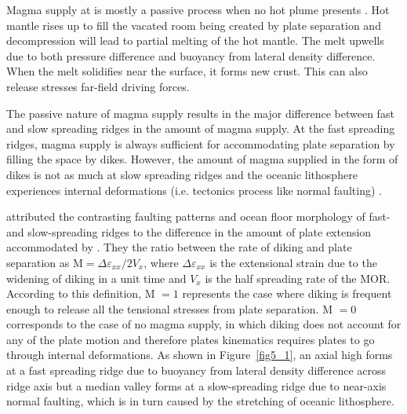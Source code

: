 \documentclass[12pt]{article}
\begin{document}
Magma supply at  is mostly a passive process when no hot plume presents \citep{Fowler2004}. Hot mantle rises up to fill the vacated room being created by plate separation and decompression will lead to partial melting of the hot mantle. The melt upwells due to both pressure difference and buoyancy from lateral density difference. When the melt solidifies near the surface, it forms new crust. This  can also release  stresses  far-field driving forces.

The passive nature of magma supply results in the major difference between fast and slow spreading ridges in the amount of magma supply. At the fast spreading ridges, magma supply is always sufficient for accommodating plate separation by filling the space by dikes. However, the amount of magma supplied in the form of dikes is not as much at slow spreading ridges and the oceanic lithosphere experiences internal deformations (i.e. tectonics process like normal faulting) . 

\citet{Buck2005} attributed the contrasting faulting patterns and ocean floor morphology of fast- and slow-spreading ridges to the difference in the amount of plate extension accommodated by . They  the ratio between the rate of diking and plate separation as M$=\Delta\varepsilon_{xx}/2V_{x}$, where $\Delta\varepsilon_{xx}$ is the extensional strain due to the widening of diking in a unit time and $V_{x}$ is the half spreading rate of the MOR. According to this definition, M $=1$ represents the case where diking is frequent enough to release all the tensional stresses from plate separation. M $=0$ corresponds to the case of no magma supply, in which diking does not account for any of the plate motion and therefore plates kinematics requires plates to go through internal deformations. As shown in Figure~\ref{fig5_1}, an axial high forms at a fast spreading ridge due to buoyancy from lateral density difference across ridge axis but a median valley forms at a slow-spreading ridge due to near-axis normal faulting, which is in turn caused by the stretching of oceanic lithosphere.
\end{document}
